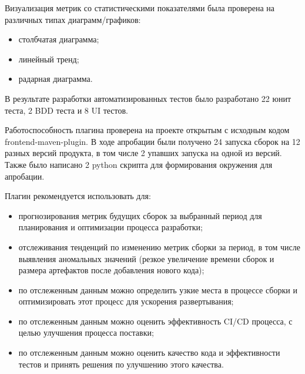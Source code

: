 Визуализация метрик со статистическими показателями была проверена на различных типах диаграмм/графиков:

\begin{itemize}
	\item столбчатая диаграмма;
	\item линейный тренд;
	\item радарная диаграмма.
\end{itemize}

В результате разработки автоматизированных тестов было разработано 22 юнит теста, 2 BDD теста и 8 UI тестов.

Работоспособность плагина проверена на проекте открытым с исходным кодом frontend-maven-plugin. В ходе апробации были получено 24 запуска сборок на 12 разных версий продукта, в том числе 2 упавших запуска на одной из версий. Также было написано 2 python скрипта для формирования окружения для апробации.

Плагин рекомендуется использовать для:

\begin{itemize}
	\item прогнозирования метрик будущих сборок за выбранный период для планирования и оптимизации процесса разработки;
	\item отслеживания тенденций по изменению метрик сборки за период, в том числе выявления аномальных значений (резкое увеличение времени сборок и размера артефактов после добавления нового кода);
	\item по отслеженным данным можно определить узкие места в процессе сборки и оптимизировать этот процесс для ускорения развертывания;
	\item по отслеженным данным можно оценить эффективность CI/CD процесса, с целью улучшения процесса поставки;
	\item по отслеженным данным можно оценить качество кода и эффективности тестов и принять решения по улучшению этого качества.
\end{itemize}






%
%

%
%






